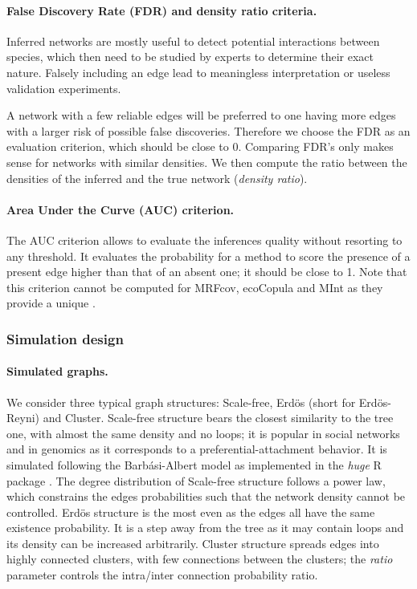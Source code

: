 \paragraph{False Discovery Rate (FDR) and density ratio criteria.}
Inferred networks are mostly useful to detect potential interactions between species, which then need to be studied by experts to determine their exact nature. Falsely including an edge lead to meaningless interpretation or useless validation experiments. 

A network with a few reliable edges will be preferred to one having more edges with a larger risk of possible false discoveries. Therefore we choose the FDR as an evaluation criterion, which should be close to 0. Comparing FDR's only makes sense for networks with similar densities. We then compute the ratio between the densities of the inferred and the true network ({\sl density ratio}).

\paragraph{Area Under the Curve (AUC) criterion.}
The AUC criterion allows to evaluate the inferences quality without resorting to any threshold. It evaluates the probability for a method to score the presence of a present edge higher than that of an absent one; it should be close to 1. Note that this criterion cannot be computed for MRFcov, ecoCopula and MInt as they provide a unique 
. 





\subsubsection{Simulation design}
 
\paragraph{Simulated graphs.}
We consider three typical graph structures: Scale-free, Erdös (short for Erdös-Reyni) and Cluster.
Scale-free structure bears the closest similarity to the tree one, with almost the same density and no loops; it is popular in social networks and in genomics as it corresponds to a preferential-attachment behavior. 
It is simulated following the Barb\'{a}si-Albert model as implemented in the \textit{huge} R package \citep{huge}. The degree distribution of Scale-free structure follows a power law, which constrains the edges probabilities such that the network density cannot be controlled.
Erdös structure is the most even as the edges all have the same existence probability. It is a step away from the tree as it may contain loops and its density can be increased arbitrarily.
Cluster structure spreads edges into highly connected clusters, with few connections between the clusters; the \textit{ratio} parameter controls the intra/inter connection probability ratio.




